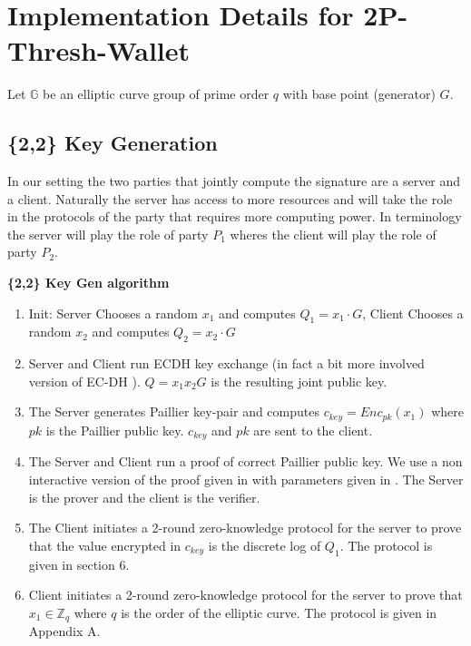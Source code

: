 \documentclass[runningheads]{llncs}
\begin{document}
\section{Implementation Details for 2P-Thresh-Wallet}
Let $\mathbb{G}$ be an elliptic curve group of prime order $q$ with base point (generator) $G$.

\subsection{\{2,2\} Key Generation}
In our setting the two parties that jointly compute the signature are a server and a client. Naturally the server has access to more resources and will take the role in the protocols of the party that requires more computing power. In \cite{lindell17} terminology the server will play the role of party ${P_1}$ wheres the client will play the role of party ${P_2}$.

\begin{mdframed}[userdefinedwidth = 12.3cm]
\textbf{\{2,2\} Key Gen algorithm}
\begin{enumerate}
\item Init: Server Chooses a random ${x_1}$  and computes ${Q_1 = x_1 \cdot G}$, Client Chooses a random ${x_2}$  and computes ${Q_2 = x_2 \cdot G}$
\item Server and Client run ECDH key exchange (in fact a bit more involved version of EC-DH \cite{lindell17}). $Q=x_1x_2G$ is the resulting joint public key. 
\item The Server generates Paillier key-pair and computes ${c_{key} =Enc_{pk}(x_1)}$ where ${pk}$ is the Paillier public key. ${c_{key}}$ and ${pk}$ are sent to the client.
\item The Server and Client run a proof of correct Paillier public key. We use a non interactive version of the proof given in \cite{sharon} with parameters given in \cite{lindell18}. The Server is the prover and the client is the verifier.
\item The Client initiates a 2-round zero-knowledge protocol for the server to prove that the value encrypted in ${c_{key}}$ is the discrete log of ${Q_1}$. The protocol is given in \cite{lindell17} section 6.
\item Client initiates a 2-round zero-knowledge protocol for the server to prove that ${x_1 \in \mathbb{Z}_q}$ where ${q}$ is the order of the elliptic curve. The protocol is given in \cite{lindell17} Appendix A.
\end{enumerate}

\end{mdframed}
\end{document}
